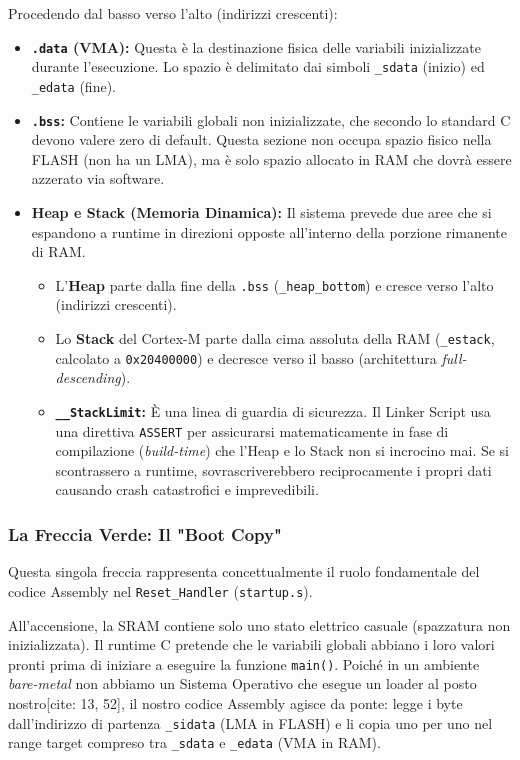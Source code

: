 Procedendo dal basso verso l'alto (indirizzi crescenti):
\begin{itemize}
    \item \textbf{\texttt{.data} (VMA):} Questa è la destinazione fisica delle variabili inizializzate durante l'esecuzione. Lo spazio è delimitato dai simboli \texttt{\_sdata} (inizio) ed \texttt{\_edata} (fine).
    \item \textbf{\texttt{.bss}:} Contiene le variabili globali non inizializzate, che secondo lo standard C devono valere zero di default. Questa sezione non occupa spazio fisico nella FLASH (non ha un LMA), ma è solo spazio allocato in RAM che dovrà essere azzerato via software.
    \item \textbf{Heap e Stack (Memoria Dinamica):} Il sistema prevede due aree che si espandono a runtime in direzioni opposte all'interno della porzione rimanente di RAM.
    \begin{itemize}
        \item L'\textbf{Heap} parte dalla fine della \texttt{.bss} (\texttt{\_heap\_bottom}) e cresce verso l'alto (indirizzi crescenti).
        \item Lo \textbf{Stack} del Cortex-M parte dalla cima assoluta della RAM (\texttt{\_estack}, calcolato a \texttt{0x20400000}) e decresce verso il basso (architettura \textit{full-descending}).
        \item \textbf{\texttt{\_\_StackLimit}:} È una linea di guardia di sicurezza. Il Linker Script usa una direttiva \texttt{ASSERT} per assicurarsi matematicamente in fase di compilazione (\textit{build-time}) che l'Heap e lo Stack non si incrocino mai. Se si scontrassero a runtime, sovrascriverebbero reciprocamente i propri dati causando crash catastrofici e imprevedibili.
    \end{itemize}
\end{itemize}

\subsubsection*{La Freccia Verde: Il "Boot Copy"}
Questa singola freccia rappresenta concettualmente il ruolo fondamentale del codice Assembly nel \texttt{Reset\_Handler} (\texttt{startup.s}).

All'accensione, la SRAM contiene solo uno stato elettrico casuale (spazzatura non inizializzata). Il runtime C pretende che le variabili globali abbiano i loro valori pronti prima di iniziare a eseguire la funzione \texttt{main()}. Poiché in un ambiente \textit{bare-metal} non abbiamo un Sistema Operativo che esegue un loader al posto nostro[cite: 13, 52], il nostro codice Assembly agisce da ponte: legge i byte dall'indirizzo di partenza \texttt{\_sidata} (LMA in FLASH) e li copia uno per uno nel range target compreso tra \texttt{\_sdata} e \texttt{\_edata} (VMA in RAM).

